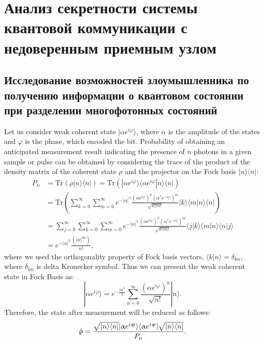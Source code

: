 \chapter{Анализ секретности системы квантовой коммуникации с недоверенным приемным узлом} \label{ch:ch6}
\section{Исследование возможностей злоумышленника по получению информации о квантовом состоянии при разделении многофотонных состояний} \label{sec:ch6/sec1}

Let us consider weak coherent state $|\alpha e^{i \varphi}\rangle$, where $\alpha$ is the amplitude of the states and  $\varphi$ is the phase, which encoded the bit. Probability of obtaining an anticipated measurement result indicating the presence of $n$ photons in a given sample or pulse can be obtained by considering the trace of the product of the density matrix of the coherent state $\rho$ and the projector on the Fock basis $|n\rangle\langle n|$: 
%
\begin{align}
    P_n&=\text{Tr}(\rho |n\rangle\langle n|) = \text{Tr}(|\alpha e^{i \varphi}\rangle \langle\alpha e^{i \varphi} |n\rangle\langle n|) \nonumber \\
    &= \text{Tr}(\sum_{k=0}^{\infty}\sum_{m=0}^{\infty} e^{-|\alpha|^2} \frac{(\alpha e^{i \varphi})^k(\alpha^{*} e^{-i \varphi})^m}{\sqrt{k!m!}} |k\rangle\langle m |n\rangle\langle n|) \nonumber  \\
    &=\sum_{j=0}^{\infty}\sum_{k=0}^{\infty}\sum_{m=0}^{\infty} e^{-|\alpha|^2} \frac{(\alpha e^{i \varphi})^k(\alpha^{*} e^{-i \varphi})^m}{\sqrt{k!m!}}\langle j |k\rangle\langle m |n\rangle\langle n|j\rangle \nonumber  \\
    &=e^{-|\alpha|^2} \frac{(|\alpha|^{2n})}{n!}, \label{pnver}
\end{align}
% 
where we used the orthogonality property of Fock basis vectors, $\langle k| n \rangle = \delta_{kn}$, where $\delta_{kn}$ is delta Kronecker symbol. Thus we can present the weak coherent state in Fock Basis as:
%
\begin{equation}
    |\alpha e^{i \varphi}\rangle = e^{-\frac{|\alpha|^2}{2}}\sum_{n=0}^{\infty}  \frac{(\alpha e^{i \varphi})^n}{\sqrt{n!}} |n\rangle.
\end{equation}
%
Therefore, the state after measurement will be reduced as follows:
%
\begin{equation}
    \Tilde{\rho}=\frac{\sqrt{|n\rangle\langle n|} |\alpha e^{i \varphi}\rangle \langle\alpha e^{i \varphi} | \sqrt{|n\rangle\langle n|}}{P_n}.
\end{equation}
